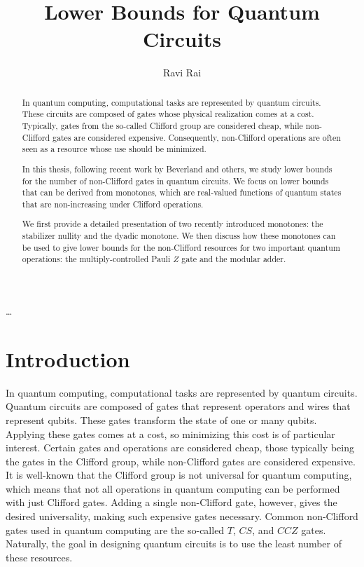 \documentclass[12pt]{dalthesis}
\begin{document}
\title{Lower Bounds for Quantum Circuits}
\author{Ravi Rai}
\mcs
{}

\nolistoftables
\nolistoffigures

\frontmatter

\begin{abstract}
In quantum computing, computational tasks are represented by quantum circuits. These circuits are composed of gates whose physical realization comes at a cost. Typically, gates from the so-called Clifford group are considered cheap, while non-Clifford gates are considered expensive. Consequently, non-Clifford operations are often seen as a resource whose use should be minimized.

In this thesis, following recent work by Beverland and others, we study lower bounds for the number of non-Clifford gates in quantum circuits. We focus on lower bounds that can be derived from monotones, which are real-valued functions of quantum states that are non-increasing under Clifford operations.

We first provide a detailed presentation of two recently introduced monotones: the stabilizer nullity and the dyadic monotone. We then discuss how these monotones can be used to give lower bounds for the non-Clifford resources for two important quantum operations: the multiply-controlled Pauli $Z$ gate and the modular adder.
\end{abstract}

\begin{acknowledgements}
\ldots
\end{acknowledgements}

\mainmatter

\chapter{Introduction}

In quantum computing, computational tasks are represented by quantum circuits. Quantum circuits are composed of gates that represent operators and wires that represent qubits. These gates transform the state of one or many qubits. Applying these gates comes at a cost, so minimizing this cost is of particular interest. Certain gates and operations are considered cheap, those typically being the gates in the Clifford group, while non-Clifford gates are considered expensive. It is well-known that the Clifford group is not universal for quantum computing, which means that not all operations in quantum computing can be performed with just Clifford gates. Adding a single non-Clifford gate, however, gives the desired universality, making such expensive gates necessary. Common non-Clifford gates used in quantum computing are the so-called $T$, $CS$, and $CCZ$ gates. Naturally, the goal in designing quantum circuits is to use the least number of these resources.
\end{document}
